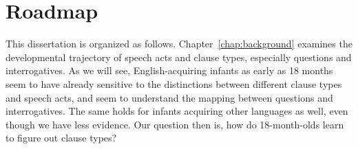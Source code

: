 \section{Roadmap}
This dissertation is organized as follows. Chapter~\ref{chap:background} examines the developmental trajectory of speech acts and clause types, especially questions and interrogatives. As we will see, English-acquiring infants as early as 18 months seem to have already sensitive to the distinctions between different clause types and speech acts, and seem to understand the mapping between questions and interrogatives. The same holds for infants acquiring other languages as well, even though we have less evidence. Our question then is, how do 18-month-olds learn to figure out clause types?


